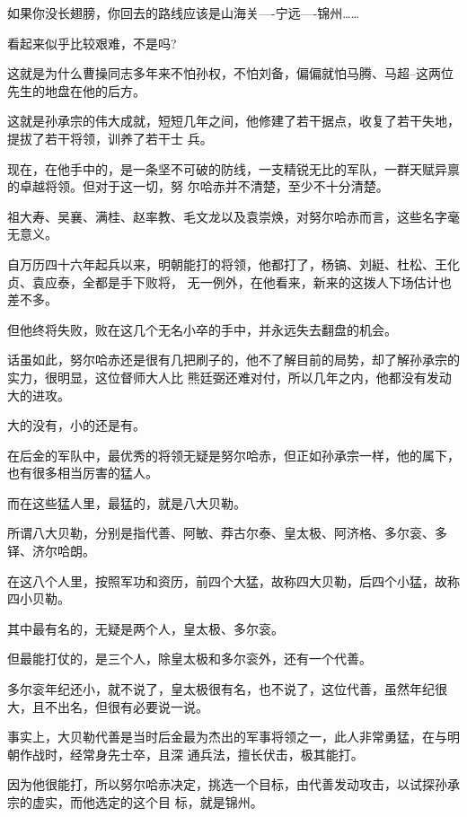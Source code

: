 \documentclass[11pt,a4paper,onecolumn]{article}
\begin{document}
如果你没长翅膀，你回去的路线应该是山海关----宁远----锦州……

看起来似乎比较艰难，不是吗?

这就是为什么曹操同志多年来不怕孙权，不怕刘备，偏偏就怕马腾、马超--这两位先生的地盘在他的后方。

这就是孙承宗的伟大成就，短短几年之间，他修建了若干据点，收复了若干失地，提拔了若干将领，训养了若干士
兵。

现在，在他手中的，是一条坚不可破的防线，一支精锐无比的军队，一群天赋异禀的卓越将领。但对于这一切，努
尔哈赤并不清楚，至少不十分清楚。

祖大寿、吴襄、满桂、赵率教、毛文龙以及袁崇焕，对努尔哈赤而言，这些名字毫无意义。

自万历四十六年起兵以来，明朝能打的将领，他都打了，杨镐、刘綎、杜松、王化贞、袁应泰，全都是手下败将，
无一例外，在他看来，新来的这拨人下场估计也差不多。

但他终将失败，败在这几个无名小卒的手中，并永远失去翻盘的机会。

话虽如此，努尔哈赤还是很有几把刷子的，他不了解目前的局势，却了解孙承宗的实力，很明显，这位督师大人比
熊廷弼还难对付，所以几年之内，他都没有发动大的进攻。

大的没有，小的还是有。

在后金的军队中，最优秀的将领无疑是努尔哈赤，但正如孙承宗一样，他的属下，也有很多相当厉害的猛人。

而在这些猛人里，最猛的，就是八大贝勒。

所谓八大贝勒，分别是指代善、阿敏、莽古尔泰、皇太极、阿济格、多尔衮、多铎、济尔哈朗。

在这八个人里，按照军功和资历，前四个大猛，故称四大贝勒，后四个小猛，故称四小贝勒。

其中最有名的，无疑是两个人，皇太极、多尔衮。

但最能打仗的，是三个人，除皇太极和多尔衮外，还有一个代善。

多尔衮年纪还小，就不说了，皇太极很有名，也不说了，这位代善，虽然年纪很大，且不出名，但很有必要说一说。

事实上，大贝勒代善是当时后金最为杰出的军事将领之一，此人非常勇猛，在与明朝作战时，经常身先士卒，且深
通兵法，擅长伏击，极其能打。

因为他很能打，所以努尔哈赤决定，挑选一个目标，由代善发动攻击，以试探孙承宗的虚实，而他选定的这个目
标，就是锦州。

\section[\thesection]{}
\end{document}
